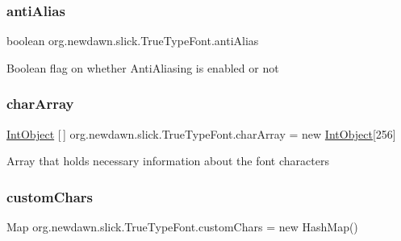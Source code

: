 \subsubsection{\texorpdfstring{anti\+Alias}{antiAlias}}
{\footnotesize\ttfamily boolean org.\+newdawn.\+slick.\+True\+Type\+Font.\+anti\+Alias\hspace{0.3cm}{\ttfamily [private]}}

Boolean flag on whether Anti\+Aliasing is enabled or not \mbox{\label{classorg_1_1newdawn_1_1slick_1_1_true_type_font_ae10a9ca17036288b7f76bd7ca10e4ea6}} 
\subsubsection{\texorpdfstring{char\+Array}{charArray}}
{\footnotesize\ttfamily \mbox{\hyperlink{classorg_1_1newdawn_1_1slick_1_1_true_type_font_classorg_1_1newdawn_1_1slick_1_1_true_type_font_1_1_int_object}{Int\+Object}} \mbox{[}$\,$\mbox{]} org.\+newdawn.\+slick.\+True\+Type\+Font.\+char\+Array = new \mbox{\hyperlink{classorg_1_1newdawn_1_1slick_1_1_true_type_font_classorg_1_1newdawn_1_1slick_1_1_true_type_font_1_1_int_object}{Int\+Object}}\mbox{[}256\mbox{]}\hspace{0.3cm}{\ttfamily [private]}}

Array that holds necessary information about the font characters \mbox{\label{classorg_1_1newdawn_1_1slick_1_1_true_type_font_a9043b8f092d2d1b8c7d65a4518fc4d3f}} 
\subsubsection{\texorpdfstring{custom\+Chars}{customChars}}
{\footnotesize\ttfamily Map org.\+newdawn.\+slick.\+True\+Type\+Font.\+custom\+Chars = new Hash\+Map()\hspace{0.3cm}{\ttfamily [private]}}

